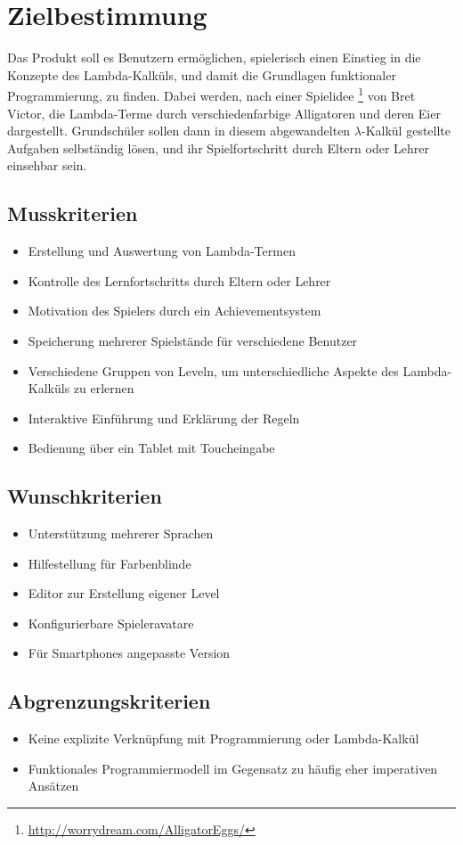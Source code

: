 \section{Zielbestimmung}
Das Produkt soll es Benutzern ermöglichen, spielerisch einen Einstieg in die Konzepte des Lambda-Kalküls, und damit die Grundlagen funktionaler Programmierung, zu finden.
Dabei werden, nach einer Spielidee \footnote{\url{http://worrydream.com/AlligatorEggs/}} von Bret Victor, die Lambda-Terme durch verschiedenfarbige Alligatoren und deren Eier dargestellt.
Grundschüler sollen dann in diesem abgewandelten \(\lambda\)-Kalkül gestellte Aufgaben selbständig lösen, und ihr Spielfortschritt durch Eltern oder Lehrer einsehbar sein.


\subsection{Musskriterien}

\begin{itemize}
	\item Erstellung und Auswertung von Lambda-Termen
	\item Kontrolle des Lernfortschritts durch Eltern oder Lehrer
	\item Motivation des Spielers durch ein Achievementsystem
	\item Speicherung mehrerer Spielstände für verschiedene Benutzer
	\item Verschiedene Gruppen von Leveln, um unterschiedliche Aspekte des Lambda-Kalküls zu erlernen
	\item Interaktive Einführung und Erklärung der Regeln
	\item Bedienung über ein Tablet mit Toucheingabe
\end{itemize}


\subsection{Wunschkriterien}

\begin{itemize}
	\item Unterstützung mehrerer Sprachen
	\item Hilfestellung für Farbenblinde
	\item Editor zur Erstellung eigener Level
	\item Konfigurierbare Spieleravatare
	\item Für Smartphones angepasste Version
\end{itemize}


\subsection{Abgrenzungskriterien}

\begin{itemize}
	\item Keine explizite Verknüpfung mit Programmierung oder Lambda-Kalkül
	\item Funktionales Programmiermodell im Gegensatz zu häufig eher imperativen Ansätzen
\end{itemize}
